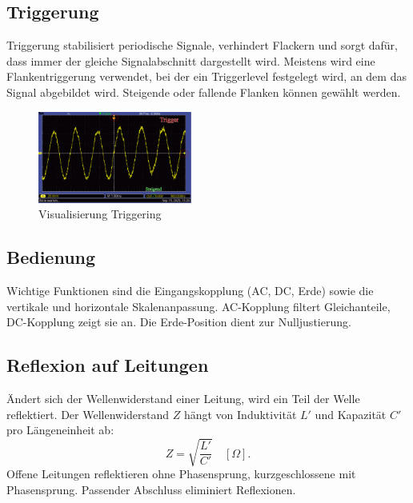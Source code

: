 \subsection{Triggerung}
Triggerung stabilisiert periodische Signale, verhindert Flackern und sorgt dafür, dass immer der gleiche Signalabschnitt dargestellt wird. Meistens wird eine Flankentriggerung verwendet, bei der ein Triggerlevel festgelegt wird, an dem das Signal abgebildet wird. Steigende oder fallende Flanken können gewählt werden.
\begin{figure} [h!]
    \centering
        \includegraphics[width=0.45\textwidth]{img/25/Triggering.pdf}
    \caption{Visualisierung Triggering}
\end{figure}


\subsection{Bedienung}
Wichtige Funktionen sind die Eingangskopplung (AC, DC, Erde) sowie die vertikale und horizontale Skalenanpassung. AC-Kopplung filtert Gleichanteile, DC-Kopplung zeigt sie an. Die Erde-Position dient zur Nulljustierung.

\subsection{Reflexion auf Leitungen}
Ändert sich der Wellenwiderstand einer Leitung, wird ein Teil der Welle reflektiert. Der Wellenwiderstand $Z$ hängt von Induktivität $L'$ und Kapazität $C'$ pro Längeneinheit ab:
\begin{equation}
Z = \sqrt{\frac{L'}{C'}} \quad [\Omega].
\end{equation}
Offene Leitungen reflektieren ohne Phasensprung, kurzgeschlossene mit Phasensprung. Passender Abschluss eliminiert Reflexionen.

